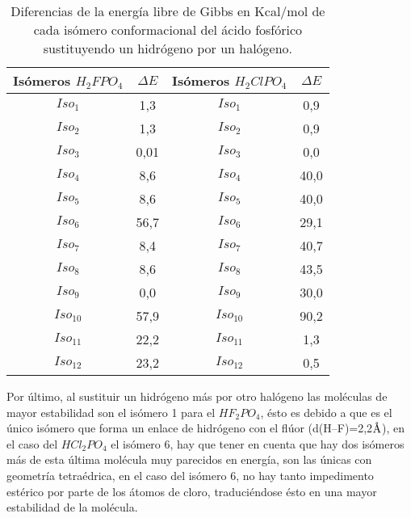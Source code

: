 \begin{table}[H]
\begin{center}
\begin{tabular}{|c|c|c|c|}
\hline
Isómeros $H_2FPO_4$ & $\Delta E$ & Isómeros $H_2ClPO_4$ & $\Delta E$ \\ \hline
$Iso_1$& 1,3 & $Iso_1$ & 0,9 \\ \hline
$Iso_2$ & 1,3 & $Iso_2$ & 0,9 \\ \hline
$Iso_3$ & 0,01 & $Iso_3$ & 0,0 \\ \hline
$Iso_4$	& 8,6 & $Iso_4$ & 40,0 \\ \hline
$Iso_5$	& 8,6 & $Iso_5$ & 40,0 \\ \hline
$Iso_6$	& 56,7 & $Iso_6$ & 29,1 \\ \hline
$Iso_7$	& 8,4 & $Iso_7$ & 40,7 \\ \hline
$Iso_8$	& 8,6 & $Iso_8$ & 43,5 \\ \hline
$Iso_9$	& 0,0 & $Iso_9$ & 30,0 \\ \hline
$Iso_{10}$	& 57,9 & $Iso_{10}$ & 90,2 \\ \hline
$Iso_{11}$ & 22,2 & $Iso_{11}$ & 1,3 \\ \hline
$Iso_{12}$ & 23,2 & $Iso_{12}$ & 0,5 \\ \hline
\end{tabular}
\caption{Diferencias de la energía libre de Gibbs en Kcal/mol de cada isómero conformacional del ácido fosfórico sustituyendo un hidrógeno por un halógeno.}
\end{center}
\end{table}
\newpage

Por último, al sustituir un hidrógeno más por otro halógeno las moléculas de mayor estabilidad son el isómero 1 para el  $HF_2PO_4$, ésto es debido a que es el único isómero que forma un enlace de hidrógeno con el flúor (d(H--F)=2,2$\mbox{\normalfont\AA}$), en el caso del  $HCl_2PO_4$ el isómero 6, hay que tener en cuenta que hay dos isómeros más de esta última molécula muy parecidos en energía, son las únicas con geometría tetraédrica, en el caso del isómero 6, no hay tanto impedimento estérico por parte de los átomos de cloro, traduciéndose ésto en una mayor estabilidad de la molécula. 

